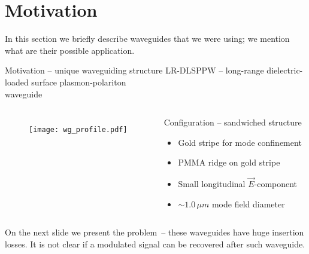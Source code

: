 


\section{Motivation}
  In this section we briefly describe waveguides that we were using; we
  mention what are their possible application.
  \begin{frame}{Motivation – unique waveguiding structure}
    LR-DLSPPW – long-range dielectric-loaded surface plasmon-polariton\\
    \hfill waveguide \cite{volkov_long-range_2011}
    \begin{columns}
        \begin{figure}
          \texttt{[image: wg\_profile.pdf]}
        \end{figure}
        \begin{block}{Configuration – sandwiched structure}
          \begin{itemize}
           \item Gold stripe for mode confinement
           \item PMMA ridge on gold stripe
           \item Small longitudinal $\vec{E}$-component
           \item $\sim 1.0\,\mu{}m$ mode field diameter
          \end{itemize}
        \end{block}
    \end{columns}
  \end{frame}
  
  On the next slide we present the problem~-- these waveguides have huge
  insertion losses. It is not clear if a modulated signal can be recovered
  after such waveguide.


